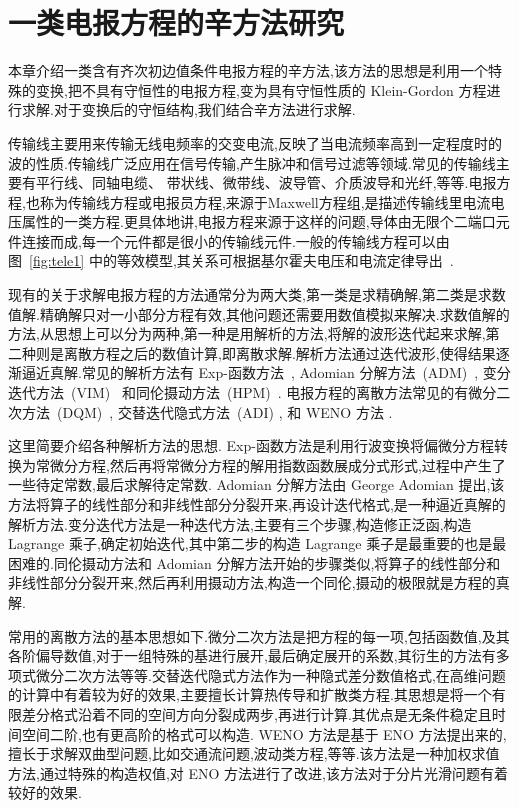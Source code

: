 \chapter{一类电报方程的辛方法研究}

本章介绍一类含有齐次初边值条件电报方程的辛方法,该方法的思想是利用一个特殊的变换,把不具有守恒性的电报方程,变为具有守恒性质的 Klein-Gordon 方程进行求解.对于变换后的守恒结构,我们结合辛方法进行求解.

传输线主要用来传输无线电频率的交变电流,反映了当电流频率高到一定程度时的波的性质.传输线广泛应用在信号传输,产生脉冲和信号过滤等领域.常见的传输线主要有平行线、同轴电缆、
带状线、微带线、波导管、介质波导和光纤,等等.电报方程,也称为传输线方程或电报员方程,来源于Maxwell方程组,是描述传输线里电流电压属性的一类方程.更具体地讲,电报方程来源于这样的问题,导体由无限个二端口元件连接而成,每一个元件都是很小的传输线元件.一般的传输线方程可以由图~\ref{fig:tele1} 中的等效模型,其关系可根据基尔霍夫电压和电流定律导出~\cite{ludwig2000rf}.

现有的关于求解电报方程的方法通常分为两大类,第一类是求精确解,第二类是求数值解.精确解只对一小部分方程有效,其他问题还需要用数值模拟来解决.求数值解的方法,从思想上可以分为两种,第一种是用解析的方法,将解的波形迭代起来求解,第二种则是离散方程之后的数值计算,即离散求解.解析方法通过迭代波形,使得结果逐渐逼近真解.常见的解析方法有 Exp-函数方法~\cite{naher2011exp}, Adomian 分解方法~(ADM)~\cite{adomian1988areview,sheikholeslami2012analytical}, 变分迭代方法~(VIM)~\cite{wu2013variational} 和同伦摄动方法~(HPM)~\cite{sheikholeslami2012homotopy}. 电报方程的离散方法常见的有微分二次方法~(DQM)~\cite{jiwari2012numerical}, 交替迭代隐式方法~(ADI) \cite{cui2013convergence}, 和 WENO 方法 \cite{borges2008improved,shen2014improvement}.

这里简要介绍各种解析方法的思想. Exp-函数方法是利用行波变换将偏微分方程转换为常微分方程,然后再将常微分方程的解用指数函数展成分式形式,过程中产生了一些待定常数,最后求解待定常数. Adomian 分解方法由 George Adomian 提出,该方法将算子的线性部分和非线性部分分裂开来,再设计迭代格式,是一种逼近真解的解析方法.变分迭代方法是一种迭代方法,主要有三个步骤,构造修正泛函,构造 Lagrange 乘子,确定初始迭代,其中第二步的构造 Lagrange 乘子是最重要的也是最困难的.同伦摄动方法和 Adomian 分解方法开始的步骤类似,将算子的线性部分和非线性部分分裂开来,然后再利用摄动方法,构造一个同伦,摄动的极限就是方程的真解.

常用的离散方法的基本思想如下.微分二次方法是把方程的每一项,包括函数值,及其各阶偏导数值,对于一组特殊的基进行展开,最后确定展开的系数,其衍生的方法有多项式微分二次方法等等.交替迭代隐式方法作为一种隐式差分数值格式,在高维问题的计算中有着较为好的效果,主要擅长计算热传导和扩散类方程.其思想是将一个有限差分格式沿着不同的空间方向分裂成两步,再进行计算.其优点是无条件稳定且时间空间二阶,也有更高阶的格式可以构造. WENO 方法是基于 ENO 方法提出来的,擅长于求解双曲型问题,比如交通流问题,波动类方程,等等.该方法是一种加权求值方法,通过特殊的构造权值,对 ENO 方法进行了改进,该方法对于分片光滑问题有着较好的效果.

